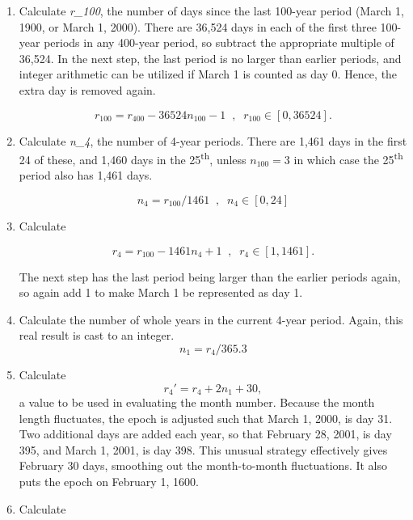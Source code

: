 {\begin{enumerate}
{\begin{enumerate}
\begin{enumerate}
\begin{equation*}
n_{100} = int ( r_{400} / 36524.3 )
\end{equation*}

\item Calculate \textit{r\_100}, the number of days since the last
100-year period (March 1, 1900, or March 1, 2000).  There are 36,524
days in each of the first three 100-year periods in any 400-year period, so
subtract the appropriate multiple of 36,524.  In the next step, the last
period is no larger than earlier periods, and integer arithmetic can be
utilized if March 1 is counted as day 0.  Hence, the extra day is
removed again.  

\begin{equation*}
r_{100}=r_{400}-36524n_{100}-1\; \; , \; \; 
r_{100}\in[0,36524].  
\end{equation*}

\item Calculate \textit{n\_4}, the number of 4-year periods.  There are
1,461 days in the first 24 of these, and 1,460 days in the
25\textsuperscript{th}, unless  $n_{100}=3$ in which case the
25\textsuperscript{th} period also has 1,461 days.  


\begin{equation*}
n_{4}=r_{100}/1461 \; \; , \; \; n_{4}\in [0,24]
\end{equation*}
 
\item Calculate  

\begin{equation*}
r_{4}=r_{100}-1461n_{4}+1 \; \; , \; \;  r_{4}\in [1,1461].  
\end{equation*}

The
next step has the last period being larger than the earlier periods
again, so again add 1 to make March 1 be represented as day 1.
\item Calculate the number of whole years in the
current 4-year period.  Again, this real result is cast to an integer.
\begin{equation*}
n_{1}=r_{4}/365.3 
\end{equation*}

\item Calculate  
\begin{equation*}
r_{4}'=r_{4}+2n_{1}+30,
\end{equation*}
a value to be used in
evaluating the month number.  Because the month length fluctuates, the
epoch is adjusted such that March 1, 2000, is day 31.  Two additional
days are added each year, so that February 28, 2001, is day 395, and
March 1, 2001, is day 398.  This unusual strategy effectively gives
February 30 days, smoothing out the month-to-month fluctuations.  It
also puts the epoch on February 1, 1600.
\item Calculate  


\end{enumerate}
\end{enumerate}}
\end{enumerate}}
